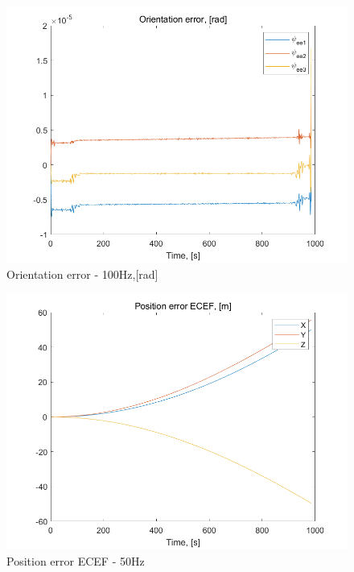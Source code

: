 \documentclass[conference]{IEEEtran}
\begin{document}
\begin{figure}[htbp]
    \centerline{\includegraphics[width=1.0\columnwidth]{fig7.png}}
    \caption{Orientation error - 100Hz,[rad]}
\end{figure}

\begin{figure}[htbp]
    \centerline{\includegraphics[width=1.0\columnwidth]{50fig1.png}}
    \caption{Position error ECEF - 50Hz}
\end{figure}
\end{document}
